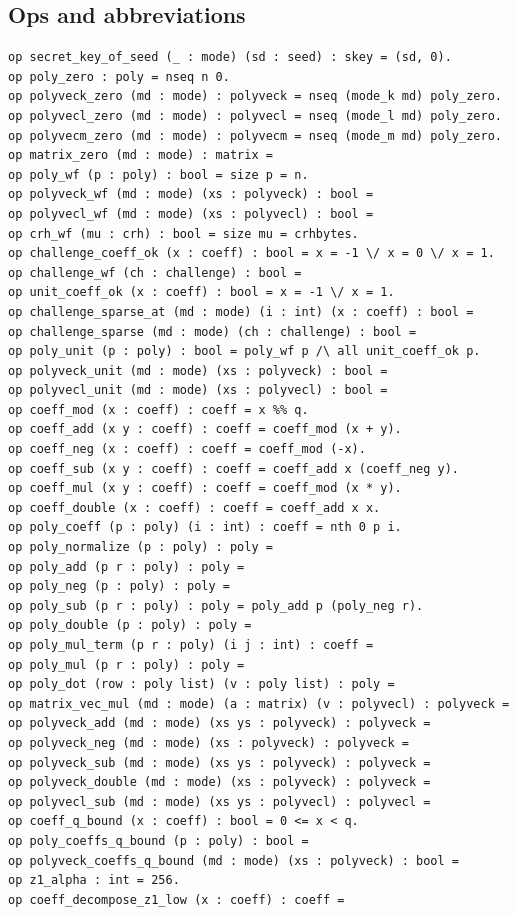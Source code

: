 \subsection*{Ops and abbreviations}
\begin{lstlisting}[language=EasyCrypt,basicstyle=\ttfamily\tiny]
op secret_key_of_seed (_ : mode) (sd : seed) : skey = (sd, 0).
op poly_zero : poly = nseq n 0.
op polyveck_zero (md : mode) : polyveck = nseq (mode_k md) poly_zero.
op polyvecl_zero (md : mode) : polyvecl = nseq (mode_l md) poly_zero.
op polyvecm_zero (md : mode) : polyvecm = nseq (mode_m md) poly_zero.
op matrix_zero (md : mode) : matrix =
op poly_wf (p : poly) : bool = size p = n.
op polyveck_wf (md : mode) (xs : polyveck) : bool =
op polyvecl_wf (md : mode) (xs : polyvecl) : bool =
op crh_wf (mu : crh) : bool = size mu = crhbytes.
op challenge_coeff_ok (x : coeff) : bool = x = -1 \/ x = 0 \/ x = 1.
op challenge_wf (ch : challenge) : bool =
op unit_coeff_ok (x : coeff) : bool = x = -1 \/ x = 1.
op challenge_sparse_at (md : mode) (i : int) (x : coeff) : bool =
op challenge_sparse (md : mode) (ch : challenge) : bool =
op poly_unit (p : poly) : bool = poly_wf p /\ all unit_coeff_ok p.
op polyveck_unit (md : mode) (xs : polyveck) : bool =
op polyvecl_unit (md : mode) (xs : polyvecl) : bool =
op coeff_mod (x : coeff) : coeff = x %% q.
op coeff_add (x y : coeff) : coeff = coeff_mod (x + y).
op coeff_neg (x : coeff) : coeff = coeff_mod (-x).
op coeff_sub (x y : coeff) : coeff = coeff_add x (coeff_neg y).
op coeff_mul (x y : coeff) : coeff = coeff_mod (x * y).
op coeff_double (x : coeff) : coeff = coeff_add x x.
op poly_coeff (p : poly) (i : int) : coeff = nth 0 p i.
op poly_normalize (p : poly) : poly =
op poly_add (p r : poly) : poly =
op poly_neg (p : poly) : poly =
op poly_sub (p r : poly) : poly = poly_add p (poly_neg r).
op poly_double (p : poly) : poly =
op poly_mul_term (p r : poly) (i j : int) : coeff =
op poly_mul (p r : poly) : poly =
op poly_dot (row : poly list) (v : poly list) : poly =
op matrix_vec_mul (md : mode) (a : matrix) (v : polyvecl) : polyveck =
op polyveck_add (md : mode) (xs ys : polyveck) : polyveck =
op polyveck_neg (md : mode) (xs : polyveck) : polyveck =
op polyveck_sub (md : mode) (xs ys : polyveck) : polyveck =
op polyveck_double (md : mode) (xs : polyveck) : polyveck =
op polyvecl_sub (md : mode) (xs ys : polyvecl) : polyvecl =
op coeff_q_bound (x : coeff) : bool = 0 <= x < q.
op poly_coeffs_q_bound (p : poly) : bool =
op polyveck_coeffs_q_bound (md : mode) (xs : polyveck) : bool =
op z1_alpha : int = 256.
op coeff_decompose_z1_low (x : coeff) : coeff =

\end{lstlisting}

